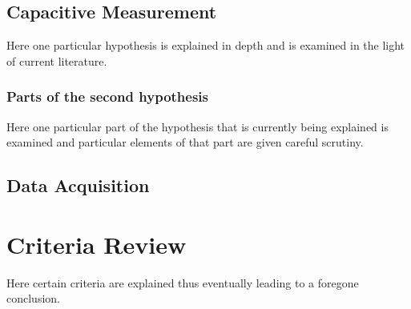 \subsection{Capacitive Measurement}

Here one particular hypothesis is explained in depth
and is examined in the light of current literature.

\subsubsection{Parts of the second hypothesis}

Here one particular part of the hypothesis that is 
currently being explained is examined and particular
elements of that part are given careful scrutiny.

\subsection{Data Acquisition}

\section{Criteria Review}

Here certain criteria are explained thus eventually
leading to a foregone conclusion.



